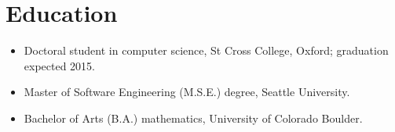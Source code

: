 \section*{Education}
\vspace{-2mm}

\begin{itemize}
    \item Doctoral student in computer science, St Cross College, Oxford;
        graduation expected 2015.\vspace{-1mm}
	\item Master of Software Engineering (M.S.E.) degree, Seattle University.\vspace{-1mm}
	\item Bachelor of Arts (B.A.) mathematics, University of Colorado Boulder.
\end{itemize}


